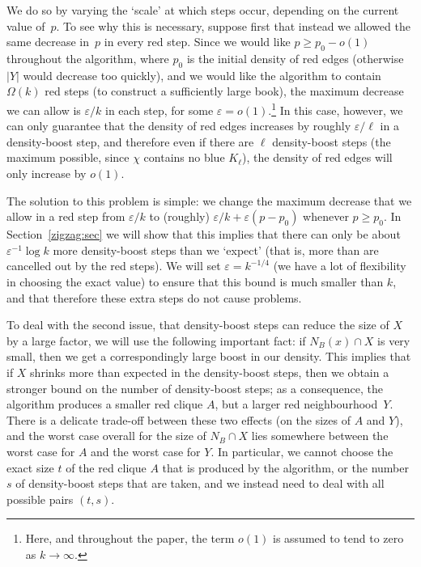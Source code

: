 \documentclass[12pt,reqno]{amsart}
\theoremstyle{definition}
\theoremstyle{remark}
\newcommand\eps{\varepsilon}
\renewcommand{\ge}{\geqslant}
\renewcommand{\to}{\rightarrow}
\def\eps{\varepsilon}
\begin{document}
We do so by varying the `scale' at which steps occur, depending on the current value of~$p$. To see why this is necessary, suppose first that instead we allowed the same decrease %
in~$p$ in every red step. Since we would like $p \ge p_0 - o(1)$ throughout the algorithm, where $p_0$ is the initial density of red edges (otherwise $|Y|$ would decrease too quickly), and we would like the algorithm to contain $\Omega(k)$ red steps (to construct a sufficiently large book), the maximum decrease we can allow is $\eps/k$ in each step, for some $\eps = o(1)$.\footnote{Here, and throughout the paper, the term $o(1)$ is assumed to tend to zero as $k \to \infty$.} In this case, however, we can only guarantee that the density of red edges increases by roughly $\eps/\ell$ in a density-boost step, and therefore even if there are $\ell$ density-boost steps (the maximum possible, since $\chi$ contains no blue $K_\ell$), the density of red edges will only increase by $o(1)$. 

The solution to this problem is simple: we change the maximum decrease that we allow in a red step from $\eps/k$ to (roughly) $\eps/k + \eps(p - p_0)$ whenever $p \ge p_0$. In Section~\ref{zigzag:sec} we will show that this implies that there can only be about $\eps^{-1} \log k$ more density-boost steps than we `expect' (that is, more than are cancelled out by the red steps). We will set $\eps = k^{-1/4}$ (we have a lot of flexibility in choosing the exact value) to ensure that this bound is much smaller than $k$, and that therefore these extra steps do not cause problems. 

To deal with the second issue, that density-boost steps can reduce the size of $X$ by a large factor, we will use the following important fact: if $N_B(x) \cap X$ is very small, then we get a correspondingly large boost in our density. 
This implies that if $X$ shrinks more than expected in the density-boost steps, then we obtain a stronger bound on the number of density-boost steps; as a consequence, the algorithm produces a smaller red clique $A$, but a larger red neighbourhood~$Y$. 
There is a delicate trade-off between these two effects (on the sizes of $A$ and $Y$),  
and the worst case overall for the size of $N_B \cap X$ lies somewhere between the worst case for $A$ and the worst case for $Y$. %
In particular, we cannot choose the exact size $t$ of the red clique $A$ that is produced by the algorithm, or the number $s$ of density-boost steps that are taken, and we instead need to deal with all possible pairs $(t,s)$.
\end{document}
